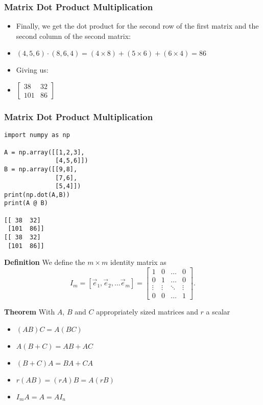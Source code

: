  \begin{frame}[fragile] \frametitle{Matrix Dot Product Multiplication}
\begin{itemize}
\item  Finally, we get the dot product for the second row of the first matrix and the second column of the second matrix:
\item $(4,5,6) \cdot (8,6,4) = (4 \times 8) + (5 \times 6) + (6 \times 4) = 86$
\item Giving us:
\item $\begin{bmatrix}38 & 32\\101 & 86\end{bmatrix}$
\end{itemize}
\end{frame}

 \begin{frame}[fragile] \frametitle{Matrix Dot Product Multiplication}

\begin{lstlisting}
import numpy as np

A = np.array([[1,2,3],
              [4,5,6]])
B = np.array([[9,8],
              [7,6],
              [5,4]])
print(np.dot(A,B))
print(A @ B)

[[ 38  32]
 [101  86]]
[[ 38  32]
 [101  86]]
\end{lstlisting}

\end{frame}

  \begin{frame}[fragile]
\textbf{Definition}
We define the $m\times m$ identity matrix as
\begin{equation*}
I_m =[\vec{e}_1, \vec{e}_2, \dots \vec{e}_m] = \left[\begin{array}{rrrrr}  1& 0 &  \dots & 0 \\  0& 1&  \dots & 0 \\ \vdots& \vdots &  \ddots & \vdots \\
                                                                                                                0& 0&  \dots & 1 \end{array}\right].
\end{equation*}



\textbf{Theorem}
 With $A$, $B$ and $C$ appropriately sized matrices and $r$ a scalar
\begin{itemize}
 \item $(AB)C = A(BC)$
\item $A(B+C) = AB + AC$
\item $(B+C)A = BA + CA$
\item $r(AB) = (rA)B = A(rB)$ 
\item $I_m A = A = A I_n$
\end{itemize}

\end{frame}




